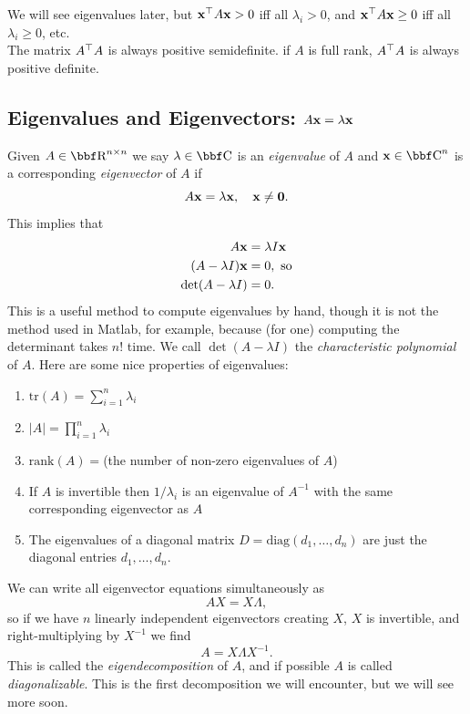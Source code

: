 \documentclass{article}
\newcommand{\rank}{\mathrm{rank}}
\begin{document}
We will see eigenvalues later, but ${\bf x}^\top A {\bf x} > 0$ iff all $\lambda_i > 0$,
and ${\bf x}^\top A{\bf x} \geq 0$ iff all $\lambda_i \geq 0$, etc.\\

The matrix $A^\top A$ is always positive semidefinite. if $A$ is full rank, $A^\top A$
is always positive definite.

\subsection{Eigenvalues and Eigenvectors: $A{\bf x} = \lambda {\bf x}$}

Given $A\in\RR^{n\times n}$ we say $\lambda\in\CC$ is an \textit{eigenvalue} of
$A$ and $\xx\in\CC^n$ is a corresponding \textit{eigenvector} of $A$ if
\[
    A{\bf x} = \lambda {\bf x},\quad {\bf x} \neq {\bf 0}.
\]
This implies that
\begin{align*}
    A{\bf x} &= \lambda I {\bf x}\\
    (A-\lambda I){\bf x} &= 0,\text{ so}\\
    {\hbox{det}}(A-\lambda I) &= 0.
\end{align*}
This is a useful method to compute eigenvalues by hand, though it is not
the method used in Matlab, for example, because (for one) computing the
determinant takes $n!$ time. We call $\det(A-\lambda I)$ the \textit{characteristic
polynomial} of $A$. Here are some nice properties of eigenvalues:
\begin{enumerate}
    \item $\mathrm{tr}(A) = \sum_{i=1}^n \lambda_i$
    \item $|A| = \prod_{i=1}^n \lambda_i$
    \item $\rank (A) = $(the number of non-zero eigenvalues of $A$)
    \item If $A$ is invertible then $1/\lambda_i$ is an eigenvalue of
        $A^{-1}$ with the same corresponding eigenvector as $A$
    \item The eigenvalues of a diagonal matrix $D=\mathrm{diag}(d_1,\dots,d_n)$
        are just the diagonal entries $d_1,\dots,d_n$.
\end{enumerate}

We can write all eigenvector equations simultaneously as
\[
    AX = X\Lambda,
\]
so if we have $n$ linearly independent eigenvectors creating $X$,
$X$ is invertible, and right-multiplying by $X^{-1}$ we find
\[
    A = X\Lambda X^{-1}.
\]
This is called the \textit{eigendecomposition} of $A$, and if
possible $A$ is called \textit{diagonalizable}. This is the first
decomposition we will encounter, but we will see more soon.
\end{document}
